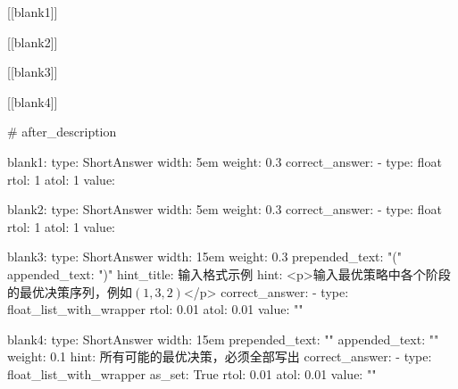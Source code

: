 [[blank1]]

[[blank2]]

[[blank3]]

[[blank4]] 

 \#{ after_description }

blank1:
    type: ShortAnswer
    width: 5em
    weight: 0.3
    correct_answer:
    - type: float
      rtol: 1
      atol: 1
      value: 

blank2:
    type: ShortAnswer
    width: 5em
    weight: 0.3
    correct_answer:
    - type: float
      rtol: 1
      atol: 1
      value: 

blank3:
    type: ShortAnswer
    width: 15em
    weight: 0.3
    prepended_text: "("
    appended_text: ")"
    hint_title: 输入格式示例
    hint: <p>输入最优策略中各个阶段的最优决策序列，例如$(1, 3, 2)$</p>
    correct_answer:
    - type: float_list_with_wrapper
      rtol: 0.01
      atol: 0.01
      value: ""

blank4:
    type: ShortAnswer
    width: 15em
    prepended_text: "{"
    appended_text: "}"
    weight: 0.1
    hint: 所有可能的最优决策，必须全部写出
    correct_answer:
    - type: float_list_with_wrapper
      as_set: True
      rtol: 0.01
      atol: 0.01
      value: ""

